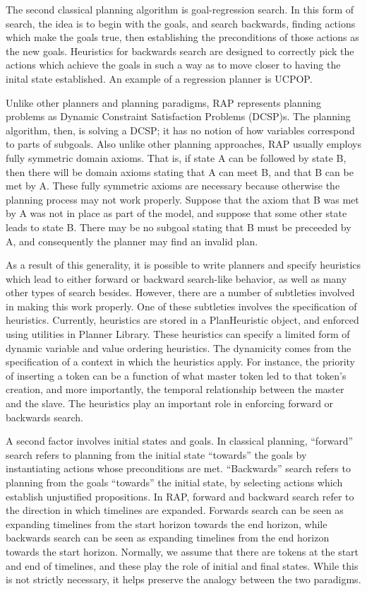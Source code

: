 The second classical planning algorithm is goal-regression search.
In this form of search, the idea is to begin with the goals, and 
search backwards, finding actions which make the goals true, then
establishing the preconditions of those actions as the new goals.
Heuristics for backwards search are designed to correctly pick
the actions which achieve the goals in such a way as to move closer
to having the inital state established.  An example of a regression
planner is UCPOP.

Unlike other planners and planning paradigms, RAP represents planning
problems as Dynamic Constraint Satisfaction Problems (DCSP)s.  The
planning algorithm, then, is solving a DCSP; it has no notion of how
variables correspond to parts of subgoals.  Also unlike other planning
approaches, RAP usually employs fully symmetric domain axioms.  That
is, if state A can be followed by state B, then there will be domain
axioms stating that A can meet B, and that B can be met by A.  These
fully symmetric axioms are necessary because otherwise the planning
process may not work properly.  Suppose that the axiom that B was met
by A was not in place as part of the model, and suppose that some other
state leads to state B.  There may be no subgoal stating that B must
be preceeded by A, and consequently the planner may find an invalid
plan.

As a result of this generality, it is possible to write planners and
specify heuristics which lead to either forward or backward
search-like behavior, as well as many other types of search besides.
However, there are a number of subtleties involved in making this work
properly.  One of these subtleties involves the specification of
heuristics.  Currently, heuristics are stored in a PlanHeuristic
object, and enforced using utilities in Planner Library.  These
heuristics can specify a limited form of dynamic variable and value
ordering heuristics.  The dynamicity comes from the specification of a
context in which the heuristics apply.  For instance, the priority of
inserting a token can be a function of what master token led to that
token's creation, and more importantly, the temporal relationship
between the master and the slave.  The heuristics play an important
role in enforcing forward or backwards search.

A second factor involves initial states and goals.  In classical
planning, ``forward'' search refers to planning from the initial state
``towards'' the goals by instantiating actions whose preconditions are
met.  ``Backwards'' search refers to planning from the goals
``towards'' the initial state, by selecting actions which establish
unjustified propositions.  In RAP, forward and backward search refer
to the direction in which timelines are expanded.  Forwards search can
be seen as expanding timelines from the start horizon towards the end
horizon, while backwards search can be seen as expanding timelines
from the end horizon towards the start horizon.  Normally, we assume
that there are tokens at the start and end of timelines, and these
play the role of initial and final states.  While this is not
strictly necessary, it helps preserve the analogy between the
two paradigms.

